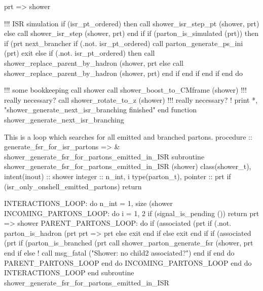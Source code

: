        prt => shower%

       !!! ISR simulation
       if (isr_pt_ordered) then
          call shower_isr_step_pt (shower, prt)
       else
          call shower_isr_step (shower, prt)
       end if
       if (parton_is_simulated (prt)) then
          if (prt%
             next_brancher%
             if (.not. isr_pt_ordered) call parton_generate_ps_ini (prt)
             exit
          else
             if (.not. isr_pt_ordered) then
                call shower_replace_parent_by_hadron (shower, prt%
             else
                call shower_replace_parent_by_hadron (shower, prt)
             end if
          end if
       end if
    end do

    !!! some bookkeeping
    call shower%
    call shower_boost_to_CMframe (shower)         !!! really necessary?
    call shower_rotate_to_z (shower)              !!! really necessary?
    ! print *, "shower_generate_next_isr_branching finished"
    end function shower_generate_next_isr_branching

\eatline
\nwendcode{}This is a loop which searches for all emitted and branched partons.
\nwenddocs{}\plusendmoddef
  procedure :: generate_fsr_for_isr_partons => &
       shower_generate_fsr_for_partons_emitted_in_ISR
\nwendcode{}\plusendmoddef
  subroutine shower_generate_fsr_for_partons_emitted_in_ISR (shower)
    class(shower_t), intent(inout) :: shower
    integer :: n_int, i
    type(parton_t), pointer :: prt
    if (isr_only_onshell_emitted_partons) return

    INTERACTIONS_LOOP: do n_int = 1, size (shower%
       INCOMING_PARTONS_LOOP: do i = 1, 2
          if (signal_is_pending ()) return
          prt => shower%
          PARENT_PARTONS_LOOP: do
             if (associated (prt%
                if (.not. parton_is_hadron (prt%
                   prt => prt%
                else
                   exit
                end if
             else
                exit
             end if
             if (associated (prt%
                if (parton_is_branched (prt%
                   call shower_parton_generate_fsr (shower, prt%
                end if
             else
                ! call msg_fatal ("Shower: no child2 associated?")
             end if
          end do PARENT_PARTONS_LOOP
       end do INCOMING_PARTONS_LOOP
    end do INTERACTIONS_LOOP
  end subroutine shower_generate_fsr_for_partons_emitted_in_ISR

